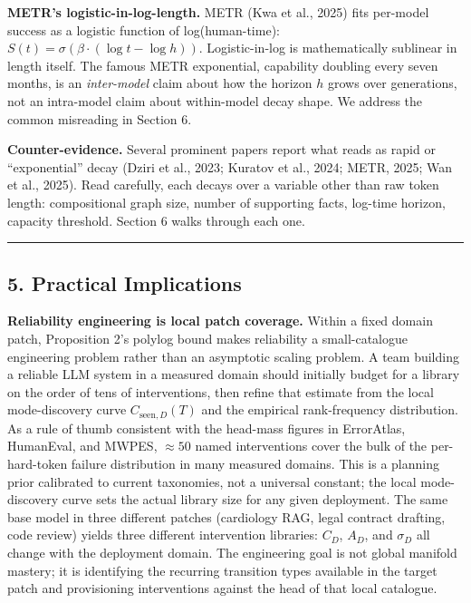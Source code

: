 \documentclass[
]{article}
\begin{document}
\textbf{METR's logistic-in-log-length.} METR (Kwa et al., 2025) fits
per-model success as a logistic function of log(human-time):
\(S(t) = \sigma(\beta \cdot (\log t - \log h))\). Logistic-in-log is
mathematically sublinear in length itself. The famous METR exponential,
capability doubling every seven months, is an \emph{inter-model} claim
about how the horizon \(h\) grows over generations, not an intra-model
claim about within-model decay shape. We address the common misreading
in Section 6.

\textbf{Counter-evidence.} Several prominent papers report what reads as
rapid or ``exponential'' decay (Dziri et al., 2023; Kuratov et al.,
2024; METR, 2025; Wan et al., 2025). Read carefully, each decays over a
variable other than raw token length: compositional graph size, number
of supporting facts, log-time horizon, capacity threshold. Section 6
walks through each one.

\begin{center}\rule{0.5\linewidth}{0.5pt}\end{center}

\subsection{5. Practical Implications}\label{practical-implications}

\textbf{Reliability engineering is local patch coverage.} Within a fixed
domain patch, Proposition 2's polylog bound makes reliability a
small-catalogue engineering problem rather than an asymptotic scaling
problem. A team building a reliable LLM system in a measured domain
should initially budget for a library on the order of tens of
interventions, then refine that estimate from the local mode-discovery
curve \(C_{\text{seen},D}(T)\) and the empirical rank-frequency
distribution. As a rule of thumb consistent with the head-mass figures
in ErrorAtlas, HumanEval, and MWPES, \(\approx 50\) named interventions
cover the bulk of the per-hard-token failure distribution in many
measured domains. This is a planning prior calibrated to current
taxonomies, not a universal constant; the local mode-discovery curve
sets the actual library size for any given deployment. The same base
model in three different patches (cardiology RAG, legal contract
drafting, code review) yields three different intervention libraries:
\(C_D\), \(A_D\), and \(\sigma_D\) all change with the deployment
domain. The engineering goal is not global manifold mastery; it is
identifying the recurring transition types available in the target patch
and provisioning interventions against the head of that local catalogue.
\end{document}
